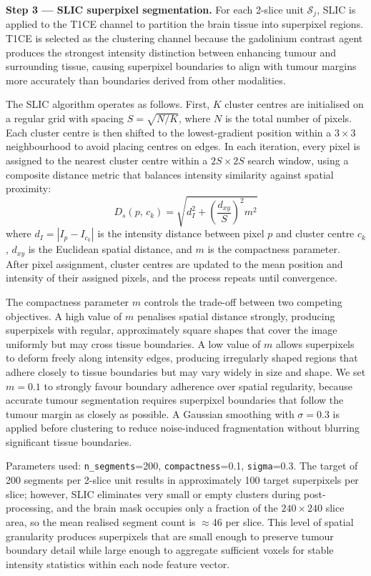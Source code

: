 \documentclass{article}
\begin{document}
\textbf{Step 3 --- SLIC superpixel segmentation.}
For each 2-slice unit $\mathcal{S}_j$, SLIC \cite{achanta2012slic} is applied to the
T1CE channel to partition the brain tissue into superpixel regions. T1CE is selected
as the clustering channel because the gadolinium contrast agent produces the
strongest intensity distinction between enhancing tumour and surrounding tissue,
causing superpixel boundaries to align with tumour margins more accurately than
boundaries derived from other modalities.

The SLIC algorithm operates as follows. First, $K$ cluster centres are initialised
on a regular grid with spacing $S = \sqrt{N/K}$, where $N$ is the total number of
pixels. Each cluster centre is then shifted to the lowest-gradient position within a
$3 \times 3$ neighbourhood to avoid placing centres on edges. In each iteration,
every pixel is assigned to the nearest cluster centre within a $2S \times 2S$ search
window, using a composite distance metric that balances intensity similarity against
spatial proximity:
\[
    D_s(p,\,c_k) = \sqrt{d_I^2 + \left(\frac{d_{xy}}{S}\right)^2 m^2}
\]
where $d_I = |I_p - I_{c_k}|$ is the intensity distance between pixel $p$ and
cluster centre $c_k$, $d_{xy}$ is the Euclidean spatial distance, and $m$ is the
compactness parameter. After pixel assignment, cluster centres are updated to the
mean position and intensity of their assigned pixels, and the process repeats until
convergence.

The compactness parameter $m$ controls the trade-off between two competing
objectives. A high value of $m$ penalises spatial distance strongly, producing
superpixels with regular, approximately square shapes that cover the image uniformly
but may cross tissue boundaries. A low value of $m$ allows superpixels to deform
freely along intensity edges, producing irregularly shaped regions that adhere
closely to tissue boundaries but may vary widely in size and shape. We set $m = 0.1$
to strongly favour boundary adherence over spatial regularity, because accurate
tumour segmentation requires superpixel boundaries that follow the tumour margin as
closely as possible. A Gaussian smoothing with $\sigma = 0.3$ is applied before
clustering to reduce noise-induced fragmentation without blurring significant tissue
boundaries.

Parameters used: \texttt{n\_segments}=200, \texttt{compactness}=0.1,
\texttt{sigma}=0.3. The target of 200 segments per 2-slice unit results in
approximately 100 target superpixels per slice; however, SLIC eliminates
very small or empty clusters during post-processing, and the brain mask occupies
only a fraction of the $240 \times 240$ slice area, so the mean realised segment
count is $\approx$46 per slice. This level of spatial granularity produces
superpixels that are small enough to preserve tumour boundary detail while large
enough to aggregate sufficient voxels for stable intensity statistics within each
node feature vector.
\end{document}
